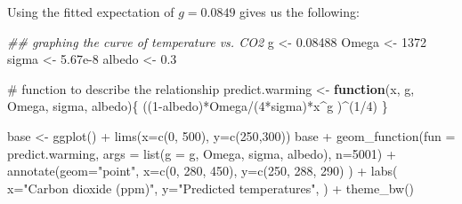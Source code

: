 \documentclass[
  letterpaper,
  DIV=11,
  numbers=noendperiod]{scrreprt}
\newenvironment{Shaded}{\begin{snugshade}}{\end{snugshade}}
\newcommand{\AttributeTok}[1]{\textcolor[rgb]{0.40,0.45,0.13}{#1}}
\newcommand{\CommentTok}[1]{\textcolor[rgb]{0.37,0.37,0.37}{#1}}
\newcommand{\ControlFlowTok}[1]{\textcolor[rgb]{0.00,0.23,0.31}{\textbf{#1}}}
\newcommand{\DecValTok}[1]{\textcolor[rgb]{0.68,0.00,0.00}{#1}}
\newcommand{\DocumentationTok}[1]{\textcolor[rgb]{0.37,0.37,0.37}{\textit{#1}}}
\newcommand{\FloatTok}[1]{\textcolor[rgb]{0.68,0.00,0.00}{#1}}
\newcommand{\FunctionTok}[1]{\textcolor[rgb]{0.28,0.35,0.67}{#1}}
\newcommand{\NormalTok}[1]{\textcolor[rgb]{0.00,0.23,0.31}{#1}}
\newcommand{\OtherTok}[1]{\textcolor[rgb]{0.00,0.23,0.31}{#1}}
\newcommand{\SpecialCharTok}[1]{\textcolor[rgb]{0.37,0.37,0.37}{#1}}
\newcommand{\StringTok}[1]{\textcolor[rgb]{0.13,0.47,0.30}{#1}}
\begin{document}
Using the fitted expectation of \(g = 0.0849\) gives us the following:

\begin{Shaded}
\begin{Highlighting}[]
\DocumentationTok{\#\# graphing the curve of temperature vs. CO2}
\NormalTok{g }\OtherTok{\textless{}{-}} \FloatTok{0.08488}
\NormalTok{Omega }\OtherTok{\textless{}{-}} \DecValTok{1372}
\NormalTok{sigma }\OtherTok{\textless{}{-}} \FloatTok{5.67e{-}8}
\NormalTok{albedo }\OtherTok{\textless{}{-}} \FloatTok{0.3}

\CommentTok{\# function to describe the relationship}
\NormalTok{predict.warming }\OtherTok{\textless{}{-}} 
  \ControlFlowTok{function}\NormalTok{(x, g, Omega, sigma, albedo)\{ }
\NormalTok{    ((}\DecValTok{1}\SpecialCharTok{{-}}\NormalTok{albedo)}\SpecialCharTok{*}\NormalTok{Omega}\SpecialCharTok{/}\NormalTok{(}\DecValTok{4}\SpecialCharTok{*}\NormalTok{sigma)}\SpecialCharTok{*}\NormalTok{x}\SpecialCharTok{\^{}}\NormalTok{g )}\SpecialCharTok{\^{}}\NormalTok{(}\DecValTok{1}\SpecialCharTok{/}\DecValTok{4}\NormalTok{)}
\NormalTok{    \}}

\NormalTok{base }\OtherTok{\textless{}{-}} \FunctionTok{ggplot}\NormalTok{() }\SpecialCharTok{+} \FunctionTok{lims}\NormalTok{(}\AttributeTok{x=}\FunctionTok{c}\NormalTok{(}\DecValTok{0}\NormalTok{, }\DecValTok{500}\NormalTok{), }\AttributeTok{y=}\FunctionTok{c}\NormalTok{(}\DecValTok{250}\NormalTok{,}\DecValTok{300}\NormalTok{))}
\NormalTok{base }\SpecialCharTok{+} 
  \FunctionTok{geom\_function}\NormalTok{(}\AttributeTok{fun =}\NormalTok{ predict.warming, }
                     \AttributeTok{args =} \FunctionTok{list}\NormalTok{(}\AttributeTok{g =}\NormalTok{ g, Omega, sigma, albedo),}
                \AttributeTok{n=}\DecValTok{5001}\NormalTok{) }\SpecialCharTok{+}
  \FunctionTok{annotate}\NormalTok{(}\AttributeTok{geom=}\StringTok{"point"}\NormalTok{, }\AttributeTok{x=}\FunctionTok{c}\NormalTok{(}\DecValTok{0}\NormalTok{, }\DecValTok{280}\NormalTok{, }\DecValTok{450}\NormalTok{), }
           \AttributeTok{y=}\FunctionTok{c}\NormalTok{(}\DecValTok{250}\NormalTok{, }\DecValTok{288}\NormalTok{, }\DecValTok{290}\NormalTok{) ) }\SpecialCharTok{+}
  \FunctionTok{labs}\NormalTok{(}
    \AttributeTok{x=}\StringTok{"Carbon dioxide (ppm)"}\NormalTok{, }
      \AttributeTok{y=}\StringTok{"Predicted temperatures"}\NormalTok{,}
\NormalTok{  ) }\SpecialCharTok{+} 
  \FunctionTok{theme\_bw}\NormalTok{()}
\end{Highlighting}
\end{Shaded}
\end{document}
